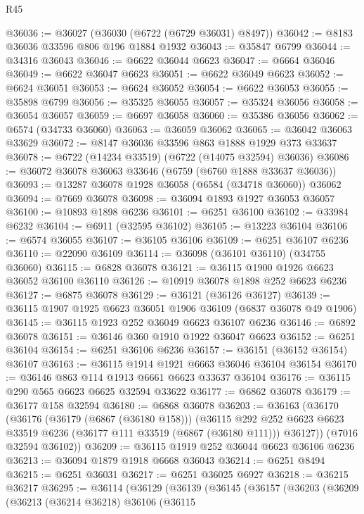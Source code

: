 \begin{lexlean}{R45}
\begin{coremodule}
{@36036 := @36027 (@36030 (@6722 (@6729 @36031) @8497))
@36042 := @8183 @36036 @33596 @806 @196 @1884 @1932
@36043 := @35847 @6799
@36044 := @34316 @36043
@36046 := @6622 @36044 @6623
@36047 := @6664 @36046
@36049 := @6622 @36047 @6623
@36051 := @6622 @36049 @6623
@36052 := @6624 @36051
@36053 := @6624 @36052
@36054 := @6622 @36053
@36055 := @35898 @6799
@36056 := @35325 @36055
@36057 := @35324 @36056
@36058 := @36054 @36057
@36059 := @6697 @36058
@36060 := @35386 @36056
@36062 := @6574 (@34733 @36060)
@36063 := @36059 @36062
@36065 := @36042 @36063 @33629
@36072 := @8147 @36036 @33596 @863 @1888 @1929 @373 @33637
@36078 := @6722 (@14234 @33519) (@6722 (@14075 @32594) @36036)
@36086 := @36072 @36078 @36063 @33646 (@6759 (@6760 @1888 @33637 @36036))
@36093 := @13287 @36078 @1928 @36058 (@6584 (@34718 @36060)) @36062
@36094 := @7669 @36078
@36098 := @36094 @1893 @1927 @36053 @36057
@36100 := @10893 @1898 @6236
@36101 := @6251 @36100
@36102 := @33984 @6232
@36104 := @6911 (@32595 @36102)
@36105 := @13223 @36104
@36106 := @6574 @36055
@36107 := @36105 @36106
@36109 := @6251 @36107 @6236
@36110 := @22090 @36109
@36114 := @36098 (@36101 @36110) (@34755 @36060)
@36115 := @6828 @36078
@36121 := @36115 @1900 @1926 @6623 @36052 @36100 @36110
@36126 := @10919 @36078 @1898 @252 @6623 @6236
@36127 := @6875 @36078
@36129 := @36121 (@36126 @36127)
@36139 := @36115 @1907 @1925 @6623 @36051 @1906 @36109 (@6837 @36078 @49 @1906)
@36145 := @36115 @1923 @252 @36049 @6623 @36107 @6236
@36146 := @6892 @36078
@36151 := @36146 @360 @1910 @1922 @36047 @6623
@36152 := @6251 @36104
@36154 := @6251 @36106 @6236
@36157 := @36151 (@36152 @36154) @36107
@36163 := @36115 @1914 @1921 @6663 @36046 @36104 @36154
@36170 := @36146 @863 @114 @1913 @6661 @6623 @33637 @36104
@36176 := @36115 @290 @565 @6623 @6625 @32594 @33622
@36177 := @6862 @36078
@36179 := @36177 @158 @32594
@36180 := @6868 @36078
@36203 := @36163
    (@36170
      (@36176
        (@36179 (@6867 (@36180 @158)))
        (@36115
          @292
          @252
          @6623
          @6623
          @33519
          @6236
          (@36177 @111 @33519 (@6867 (@36180 @111)))
          @36127))
      (@7016 @32594 @36102))
@36209 := @36115 @1919 @252 @36044 @6623 @36106 @6236
@36213 := @36094 @1879 @1918 @6668 @36043
@36214 := @6251 @8494
@36215 := @6251 @36031
@36217 := @6251 @36025 @6927
@36218 := @36215 @36217
@36295 := @36114
    (@36129
      (@36139
        (@36145
          (@36157
            (@36203
              (@36209
                (@36213
                  (@36214 @36218)
                  @36106
                  (@36115
}
\end{coremodule}
\end{lexlean}
